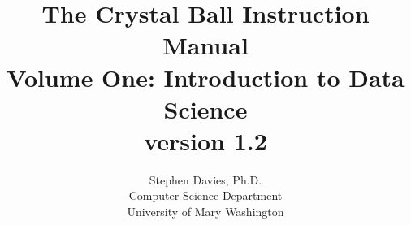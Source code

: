 \documentclass[11pt,openany]{book}
\begin{document}
\frontmatter
\title{{\huge The Crystal Ball Instruction Manual}\\[.6em]
  {\large Volume One: Introduction to Data Science}\\[.5em]
  {\small version 1.2}}
\author{Stephen Davies, Ph.D.\\Computer Science Department\\University of Mary Washington}
\date{}
\maketitle

\renewcommand{\contentsname}{Contents}
\setcounter{tocdepth}{0}
\tableofcontents

\mainmatter






























\backmatter
\printindex
\end{document}
